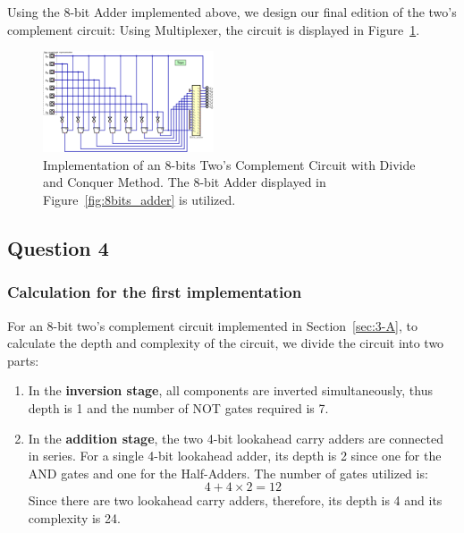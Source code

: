 \documentclass[conference]{IEEEtran}
\begin{document}
Using the 8-bit Adder implemented above, we design our final edition of the two's complement circuit: Using Multiplexer, the circuit is displayed in Figure~\ref{fig:twos_complement_course}.


\begin{figure}[h!]
\centering
\includegraphics[width=0.45\textwidth]{assets/twos_complement_course.png}
\caption{Implementation of an 8-bits Two's Complement Circuit with Divide and Conquer Method. The 8-bit Adder displayed in Figure~\ref{fig:8bits_adder} is utilized.}
\label{fig:twos_complement_course}
\end{figure}


    
\subsection{Question 4}

\subsubsection{Calculation for the first implementation}\label{sec:q4}


For an 8-bit two's complement circuit implemented in Section~\ref{sec:3-A}, to calculate the depth and complexity of the circuit, we divide the circuit into two parts:
\begin{enumerate}
    \item In the \textbf{inversion stage}, all components are inverted simultaneously, thus depth is 1 and the number of NOT gates required is 7.
    \item In the \textbf{addition stage}, the two 4-bit lookahead carry adders are connected in series.
          For a single 4-bit lookahead adder, its depth is 2 since one for the AND gates and one for the Half-Adders. The number of gates utilized is:
          \begin{equation}
            4 + 4 \times 2 = 12
          \end{equation}
          Since there are two lookahead carry adders, therefore, its depth is 4 and its complexity is 24.

\end{enumerate}
\end{document}
